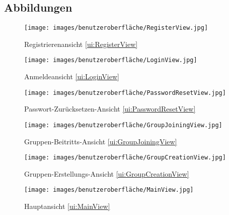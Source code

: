 \documentclass[parskip=full]{scrartcl}
\begin{document}
\subsection*{Abbildungen}
\begin{figure}[htp]
    \begin{minipage}
        [t]{0.49\textwidth}
        \centering
        \texttt{[image: images/benutzeroberfläche/RegisterView.jpg]}
        \caption{Registrierenansicht \ref{ui:RegisterView}}
        \label{fig:RegisterView}
    \end{minipage}
    \begin{minipage}
        [t]{0.49\textwidth}
        \centering
        \texttt{[image: images/benutzeroberfläche/LoginView.jpg]}
        \caption{Anmeldeansicht \ref{ui:LoginView}}
        \label{fig:LoginView}
    \end{minipage}
\end{figure}
\begin{figure}[htp]
    \begin{minipage}
        [t]{0.49\textwidth}
        \centering
        \texttt{[image: images/benutzeroberfläche/PasswordResetView.jpg]}
        \caption{Passwort-Zurücksetzen-Ansicht \ref{ui:PasswordResetView}}
        \label{fig:PasswordResetView}
    \end{minipage}
    \begin{minipage}
        [t]{0.49\textwidth}
        \centering
        \texttt{[image: images/benutzeroberfläche/GroupJoiningView.jpg]}
        \caption{Gruppen-Beitritts-Ansicht \ref{ui:GroupJoiningView}}
        \label{fig:GroupJoiningView}
    \end{minipage}
\end{figure}
\begin{figure}[htp]
    \begin{minipage}
        [t]{0.49\textwidth}
        \centering
        \texttt{[image: images/benutzeroberfläche/GroupCreationView.jpg]}
        \caption{Gruppen-Erstellungs-Ansicht \ref{ui:GroupCreationView}}
        \label{fig:GroupCreationView}
    \end{minipage}
    \begin{minipage}
        [t]{0.49\textwidth}
        \centering
        \texttt{[image: images/benutzeroberfläche/MainView.jpg]}
        \caption{Hauptansicht \ref{ui:MainView}}
        \label{fig:MainView}
    \end{minipage}
\end{figure}
\end{document}
